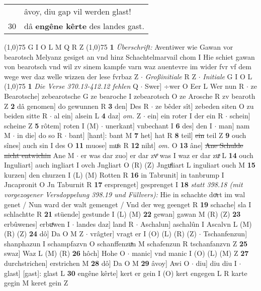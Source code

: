 \documentclass[8pt,a4paper,notitlepage]{article}
\begin{document}
\begin{table}[ht]
\begin{minipage}[t]{0.5\linewidth}
\begin{tabular}{rl}
 & âvoy, diu gap vil werden glast!\\ 
30 & dâ \textbf{engêne kêrte} des landes gast.\\ 
\end{tabular}
\scriptsize
\line(1,0){75} \newline
G I O L M Q R Z \newline
\line(1,0){75} \newline
\textbf{1} \textit{Überschrift:} Aventiwer wie Gawan vor bearotsch Melyanz gesiget an vnd hinz Schachtelmarvail chom I  Hie schiet gawan von bearotsch vnd wil zv sinem kampfe varn waz auentevre im wider fvr vf dem wege wer daz welle wizzen der lese fvrbaz Z   $\cdot$ \textit{Großinitiale} R Z   $\cdot$ \textit{Initiale} G I O L  \newline
\line(1,0){75} \newline
\textbf{1} \textit{Die Verse 370.13-412.12 fehlen} Q   $\cdot$ Swer] ÷wer O Eer L Wer nun R  $\cdot$ ze Bearotsche] zebearotsche G ze bearoche I zebearotsch O ze Arosche R zv bearoth Z \textbf{2} dâ genomen] do gewunnen R \textbf{3} den] Des R  $\cdot$ ze bêder sît] zebeden siten O zu beiden sitte R  $\cdot$ al ein] alsein L \textbf{4} daz] \textit{om.} Z  $\cdot$ ein] ein roter I der ein R  $\cdot$ schein] scheine Z \textbf{5} rôtem] roten I (M)  $\cdot$ unerkant] vnbechant I \textbf{6} des] den I  $\cdot$ man] nam M  $\cdot$ in die] do so R  $\cdot$ bant] [hant]: bant M \textbf{7} het] hat R \textbf{8} teil] \sout{ein} teil Z \textbf{9} ouch sînes] auch sin I des O \textbf{11} muose] muͦs R \textbf{12} niht] \textit{om.} O \textbf{13} âne] \sout{Ane Schulde nicht entwichin} Ane M  $\cdot$ er was dar zuo] er dar zvͤ was I waz er dar zuͯ L \textbf{14} ouch Inguliart] auch ingliart I ovch Jngliart O (R) (Z) Jnguͯliart L inguliart ouch M \textbf{15} kurzen] den churzen I (L) (M) Rotten R \textbf{16} in Tabrunit] in tanbrump I Jncapronit O Jn Taburnit R \textbf{17} ersprenget] gesprenget I \textbf{18} \textit{statt 398.18 (mit vorgezogener Versdoppelung 398.19 und Füllvers):} Hie in schachte doͯrt im wal genet / Nun ward der walt gemenget / Vnd der weg geenget R  \textbf{19} schache] sla I schlachtte R \textbf{21} stüende] gestunde I (L) (M) \textbf{22} gewan] gawan M (R) (Z) \textbf{23} erbûwenes] erbuͤwen I  $\cdot$ landes daz] land R  $\cdot$ Aschalun] aschalûn I Ascalvn L (M) (R) (Z) \textbf{24} dô] Da O M Z  $\cdot$ vrâgter] vragt er I (O) (L) (R) (Z)  $\cdot$ Tschanfenzun] shanphazun I schampfazvn O schanffenzuͯn M schafenzun R tschanfanzvn Z \textbf{25} swaz] Waz L (M) (R) \textbf{26} hôch] Hohe O  $\cdot$ manic] vnd manic I (O) (L) (M) Z \textbf{27} durchstrichen] erstrichen M \textbf{28} dô] Da O M \textbf{29} âvoy] Awi O  $\cdot$ diu] diu diu I  $\cdot$ glast] [gast]: glast L \textbf{30} engêne kêrte] kert er gein I (O) kert engegen L R karte gegin M keret gein Z \newline

\end{minipage}
\end{table}
\end{document}
